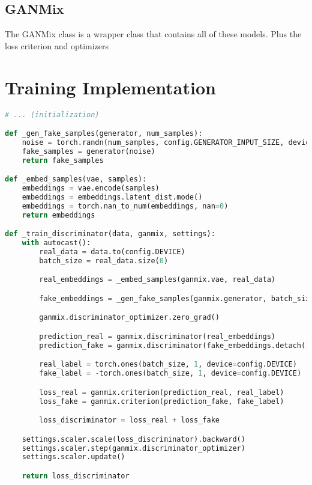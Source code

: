 \subsection{GANMix}

The GANMix class is a wrapper class that contains all of these models. Plus the loss criterion and optimizers

\section{Training Implementation}

\begin{lstlisting}[language=Python, caption={Implementation of the training loop for the GANmix.}]
# ... (initialization)

def _gen_fake_samples(generator, num_samples):
    noise = torch.randn(num_samples, config.GENERATOR_INPUT_SIZE, device=config.DEVICE)
    fake_samples = generator(noise)
    return fake_samples

def _embed_samples(vae, samples):
    embeddings = vae.encode(samples)
    embeddings = embeddings.latent_dist.mode()
    embeddings = torch.nan_to_num(embeddings, nan=0)
    return embeddings

def _train_discriminator(data, ganmix, settings):
    with autocast():
        real_data = data.to(config.DEVICE)
        batch_size = real_data.size(0)

        real_embeddings = _embed_samples(ganmix.vae, real_data)

        fake_embeddings = _gen_fake_samples(ganmix.generator, batch_size)

        ganmix.discriminator_optimizer.zero_grad()

        prediction_real = ganmix.discriminator(real_embeddings)
        prediction_fake = ganmix.discriminator(fake_embeddings.detach())

        real_label = torch.ones(batch_size, 1, device=config.DEVICE)
        fake_label = -torch.ones(batch_size, 1, device=config.DEVICE)

        loss_real = ganmix.criterion(prediction_real, real_label)
        loss_fake = ganmix.criterion(prediction_fake, fake_label)

        loss_discriminator = loss_real + loss_fake

    settings.scaler.scale(loss_discriminator).backward()
    settings.scaler.step(ganmix.discriminator_optimizer)
    settings.scaler.update()

    return loss_discriminator


\end{lstlisting}
